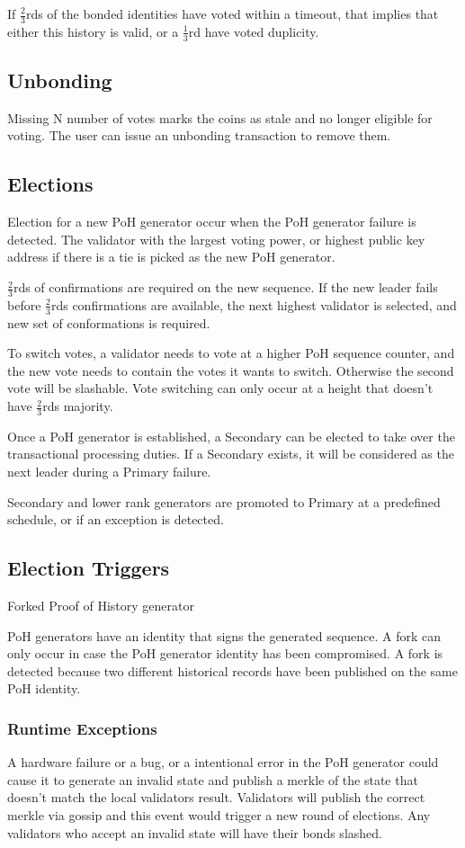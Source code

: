 \documentclass[12pt]{article}
\begin{document}
If \(\frac{2}{3}\)rds of the bonded identities have voted within a timeout, that implies that either this history is valid, or a \(\frac{1}{3}\)rd have voted duplicity.

\subsection{Unbonding}

Missing N number of votes marks the coins as stale and no longer eligible for voting.  The user can issue an unbonding transaction to remove them.
\subsection{Elections}
Election for a new PoH generator occur when the PoH generator failure is detected.  The validator with the largest voting power, or highest public key address if there is a tie is picked as the new PoH generator.

\(\frac{2}{3}\)rds of confirmations are required on the new sequence.  If the new leader fails before \(\frac{2}{3}\)rds confirmations are available, the next highest validator is selected, and new set of conformations is required.

To switch votes, a validator needs to vote at a higher PoH sequence counter, and the new vote needs to contain the votes it wants to switch.  Otherwise the second vote will be slashable. Vote switching can only occur at a height that doesn’t have \(\frac{2}{3}\)rds majority.

Once a PoH generator is established, a Secondary can be elected to take over the transactional processing duties.  If a Secondary exists, it will be considered as the next leader during a Primary failure.

Secondary and lower rank generators are promoted to Primary at a predefined schedule, or if an exception is detected.
\subsection{Election Triggers}
Forked Proof of History generator

PoH generators have an identity that signs the generated sequence.  A fork can only occur in case the PoH generator identity has been compromised.  A fork is detected because two different historical records have been published on the same PoH identity.

\subsubsection{Runtime Exceptions}
A hardware failure or a bug, or a intentional error in the PoH generator could cause it to generate an invalid state and publish a merkle of the state that doesn’t match the local validators result.  Validators will publish the correct merkle via gossip and this event would trigger a new round of elections.  Any validators who accept an invalid state will have their bonds slashed.
\end{document}
